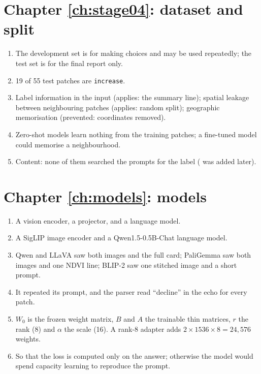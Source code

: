 \section*{Chapter \ref{ch:stage04}: dataset and split}
\begin{enumerate}
  \item The development set is for making choices and may be used repeatedly; the test set is for the final report only.
  \item 19 of 55 test patches are \texttt{increase}.
  \item Label information in the input (applies: the summary line); spatial leakage between neighbouring patches (applies: random split); geographic memorisation (prevented: coordinates removed).
  \item Zero-shot models learn nothing from the training patches; a fine-tuned model could memorise a neighbourhood.
  \item Content: none of them searched the prompts for the label ( was added later).
\end{enumerate}

\section*{Chapter \ref{ch:models}: models}
\begin{enumerate}
  \item A vision encoder, a projector, and a language model.
  \item A SigLIP image encoder and a Qwen1.5-0.5B-Chat language model.
  \item Qwen and LLaVA saw both images and the full card; PaliGemma saw both images and one NDVI line; BLIP-2 saw one stitched image and a short prompt.
  \item It repeated its prompt, and the parser read ``decline'' in the echo for every patch.
  \item $W_0$ is the frozen weight matrix, $B$ and $A$ the trainable thin matrices, $r$ the rank (8) and $\alpha$ the scale (16). A rank-8 adapter adds $2 \times 1536 \times 8 = 24{,}576$ weights.
  \item So that the loss is computed only on the answer; otherwise the model would spend capacity learning to reproduce the prompt.
\end{enumerate}

